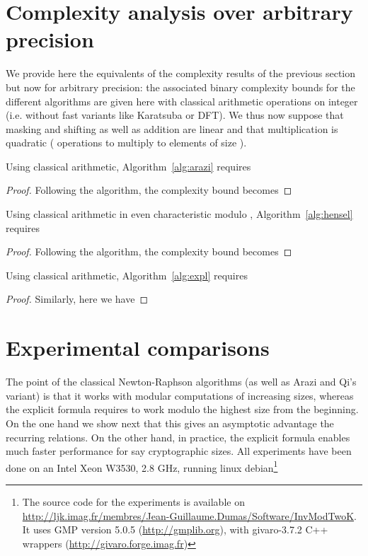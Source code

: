 \section{Complexity analysis over arbitrary precision}\label{sec:ana}
We provide here the equivalents of the complexity results of the previous
section but now for arbitrary precision: the associated binary
complexity bounds for the different algorithms are given here with classical
arithmetic operations on integer (i.e. without fast variants like Karatsuba or
DFT). 
We thus now suppose that masking and shifting as well as addition are linear
and that multiplication is quadratic ( operations to multiply to
elements of size ).
\begin{lemma}\label{lem:arazi} 
Using classical arithmetic, Algorithm~\ref{alg:arazi} requires

\end{lemma}
\begin{proof} Following the algorithm, the complexity bound becomes 

\end{proof}
\smallskip
\begin{lemma}\label{lem:henarb} 
Using classical arithmetic in even characteristic modulo , Algorithm~\ref{alg:hensel} requires 
\end{lemma}
\begin{proof} Following the algorithm, the complexity bound becomes
  
\end{proof}
\smallskip
\begin{lemma}\label{lem:explarb} 
Using classical arithmetic, Algorithm~\ref{alg:expl} requires

\end{lemma}
\begin{proof} Similarly, here we have 
\end{proof}


\section{Experimental comparisons}
The point of the classical Newton-Raphson algorithms (as well as Arazi and Qi's
variant) is that it works with modular computations of increasing sizes, whereas
the explicit formula requires to work modulo the highest size from the
beginning. 
On the one hand we show next that this gives an asymptotic advantage the recurring relations. On the other hand, in practice, the explicit formula enables
much faster performance for say cryptographic sizes.
All experiments have been done on an Intel Xeon W3530, 2.8 GHz, running linux
debian\footnote{The source code for the experiments is available on
  \url{http://ljk.imag.fr/membres/Jean-Guillaume.Dumas/Software/InvModTwoK}. It
  uses GMP version 5.0.5 (\url{http://gmplib.org}), with givaro-3.7.2 C++
  wrappers (\url{http://givaro.forge.imag.fr})}
